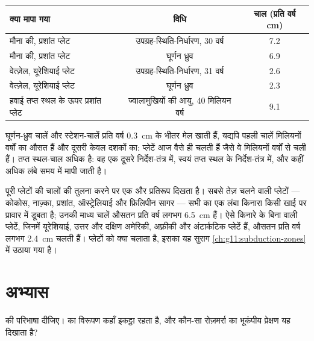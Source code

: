 \begin{center}
\small
\begin{tabular}{|l|c|c|}
\hline
क्या मापा गया & विधि & चाल (प्रति वर्ष \unit{cm}) \\ \hline
मौना की, प्रशांत प्लेट & उपग्रह-स्थिति-निर्धारण, 30 वर्ष & 7.2 \\
मौना की, प्रशांत प्लेट & घूर्णन ध्रुव & 6.9 \\
वेत्ज़ेल, यूरेशियाई प्लेट & उपग्रह-स्थिति-निर्धारण, 31 वर्ष & 2.6 \\
वेत्ज़ेल, यूरेशियाई प्लेट & घूर्णन ध्रुव & 2.3 \\
हवाई तप्त स्थल के ऊपर प्रशांत प्लेट & ज्वालामुखियों की आयु, 40 मिलियन वर्ष & 9.1 \\ \hline
\end{tabular}
\end{center}

घूर्णन-ध्रुव चालें और स्टेशन-चालें प्रति वर्ष
\qty{0.3}{cm} के भीतर मेल खाती हैं, यद्यपि पहली चालें मिलियनों वर्षों का औसत हैं और
दूसरी केवल दशकों का: प्लेटें आज वैसे ही चलती हैं जैसे वे मिलियनों
वर्षों से चली हैं। तप्त स्थल-चाल अधिक है: वह एक दूसरे निर्देश-तंत्र में, स्वयं
तप्त स्थल के निर्देश-तंत्र में, और कहीं अधिक लंबे समय में मापी जाती है।

पूरी प्लेटों की चालों की तुलना करने पर एक और प्रतिरूप दिखता है। सबसे
तेज़ चलने वाली प्लेटों --- कोकोस, नाज़्का, प्रशांत, ऑस्ट्रेलियाई और फ़िलिपीन
सागर --- सभी का एक लंबा किनारा किसी खाई पर प्रावार में डूबता है; उनकी माध्य
चालें औसतन प्रति वर्ष लगभग \qty{6.5}{cm} हैं। ऐसे किनारे के बिना वाली
प्लेटें, जिनमें यूरेशियाई, उत्तर और दक्षिण अमेरिकी, अफ़्रीकी और
अंटार्कटिक प्लेटें हैं, औसतन प्रति वर्ष लगभग \qty{2.4}{cm} चलती हैं। प्लेटों को क्या
चलाता है, इसका यह सुराग \cref{ch:g11:subduction-zones} में उठाया गया है।

\section{अभ्यास}

\begin{exercise}[$\star$]\label{exo:g11:plate-motions:1}
 की परिभाषा दीजिए।  का विरूपण कहाँ इकट्ठा रहता है,
और कौन-सा रोज़मर्रा का भूकंपीय प्रेक्षण यह दिखाता है?
\end{exercise}


